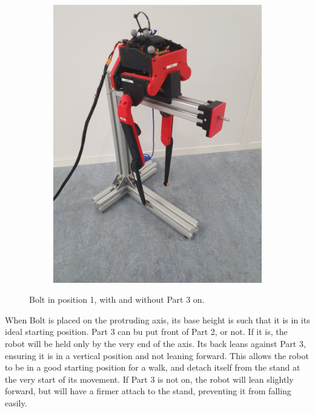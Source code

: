 \documentclass[a4paper,10pt]{article}
\begin{document}
\begin{figure}[H]
\begin{subfigure}{.5\textwidth}
  \includegraphics[width=1\linewidth, angle=0, scale=0.8]{./images/Bolt_stand_2.jpg}
\end{subfigure}
\caption{Bolt in position 1, with and without Part 3 on.}
\label{Bolt in position 1}
\end{figure}

When Bolt is placed on the protruding axis, its base height is such that it is in its ideal starting position. Part 3 can bu put front of Part 2, or not. If it is, the robot will be held only by the very end of the axis. Its back leans against Part 3, ensuring it is in a vertical position and not leaning forward. This allows the robot to be in a good starting position for a walk, and detach itself from the stand at the very start of its movement. If Part 3 is not on, the robot will lean slightly forward, but will have a firmer attach to the stand, preventing it from falling easily.\\

\vspace{5mm}
\end{document}
